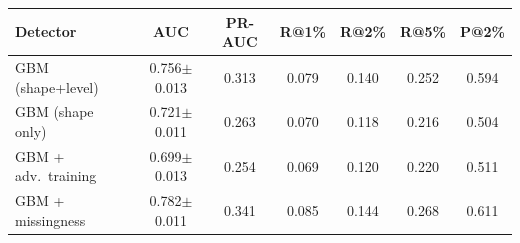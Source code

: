 \begin{tabular}{lcccccc}
\toprule
Detector & AUC & PR-AUC & R@1\% & R@2\% & R@5\% & P@2\% \\
\midrule
GBM (shape+level) & 0.756$\pm$0.013 & 0.313 & 0.079 & 0.140 & 0.252 & 0.594 \\
GBM (shape only) & 0.721$\pm$0.011 & 0.263 & 0.070 & 0.118 & 0.216 & 0.504 \\
GBM + adv.\ training & 0.699$\pm$0.013 & 0.254 & 0.069 & 0.120 & 0.220 & 0.511 \\
GBM + missingness & 0.782$\pm$0.011 & 0.341 & 0.085 & 0.144 & 0.268 & 0.611 \\
\bottomrule
\end{tabular}
